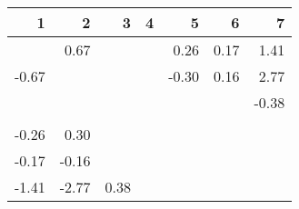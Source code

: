 \begin{table}[ht]
\centering
\begin{tabular}{rrrrrrr}
  \hline
1 & 2 & 3 & 4 & 5 & 6 & 7 \\ 
  \hline
 & 0.67 &  &  & 0.26 & 0.17 & 1.41 \\ 
  -0.67 &  &  &  & -0.30 & 0.16 & 2.77 \\ 
   &  &  &  &  &  & -0.38 \\ 
   &  &  &  &  &  &  \\ 
  -0.26 & 0.30 &  &  &  &  &  \\ 
  -0.17 & -0.16 &  &  &  &  &  \\ 
  -1.41 & -2.77 & 0.38 &  &  &  &  \\ 
   \hline
\end{tabular}
\end{table}
